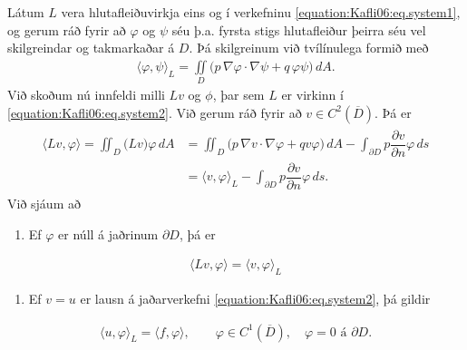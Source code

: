 \documentclass[a4paper,10pt,icelandic]{sphinxmanual}
\begin{document}
Látum \(L\) vera hlutafleiðuvirkja eins og í verkefninu \eqref{equation:Kafli06:eq.system1}, og gerum ráð fyrir að \(\varphi\) og \(\psi\) séu þ.a. fyrsta stigs hlutafleiður þeirra séu vel skilgreindar og takmarkaðar á \(D\). Þá skilgreinum við tvílínulega formið með
\begin{equation*}
\begin{split}{{\langle \varphi,\psi\rangle}}_L=\iint\limits_D\big(p\, \nabla  \varphi\cdot \nabla
\psi +q\, \varphi\psi\big)\, dA.\end{split}
\end{equation*}
Við skoðum nú innfeldi milli \(Lv\) og \(\phi\), þar sem \(L\) er virkinn í \eqref{equation:Kafli06:eq.system2}. Við gerum ráð fyrir að \(v\in C^2(\overline D)\).
Þá er
\begin{equation*}
\begin{split}\begin{aligned}
\langle L v, \varphi\rangle=\iint_D \big(Lv\big) \varphi\, dA
 &=\iint_D\big( p\,  \nabla v\cdot \nabla \varphi+q v\varphi\big)  \,
 dA-\int_{\partial D}p\dfrac{\partial v}{\partial n} \varphi \, ds\\
 &={{\langle v,\varphi\rangle}}_L
 -\int_{\partial D}p\dfrac{\partial v}{\partial n} \varphi \, ds.\end{aligned}\end{split}
\end{equation*}
Við sjáum að
\begin{enumerate}
\def\theenumi{\arabic{enumi}}
\def\labelenumi{\theenumi .}
\makeatletter\def\p@enumii{\p@enumi \theenumi .}\makeatother
\item {} 
Ef \(\varphi\) er núll á jaðrinum \(\partial D\), þá er

\end{enumerate}
\begin{equation*}
\begin{split}\langle L v, \varphi\rangle={{\langle v,\varphi\rangle}}_L\end{split}
\end{equation*}\begin{enumerate}
\def\theenumi{\arabic{enumi}}
\def\labelenumi{\theenumi .}
\makeatletter\def\p@enumii{\p@enumi \theenumi .}\makeatother
\setcounter{enumi}{1}
\item {} 
Ef \(v=u\) er lausn á jaðarverkefni \eqref{equation:Kafli06:eq.system2}, þá gildir

\end{enumerate}
\begin{equation}\label{equation:Kafli06:eq.cond2}
\begin{split}{{\langle u,\varphi\rangle}}_L={{\langle f,\varphi\rangle}}, \qquad \varphi\in C^1(\overline
D), \quad \varphi=0 \text{ á } \partial D.\end{split}
\end{equation}
\end{document}
